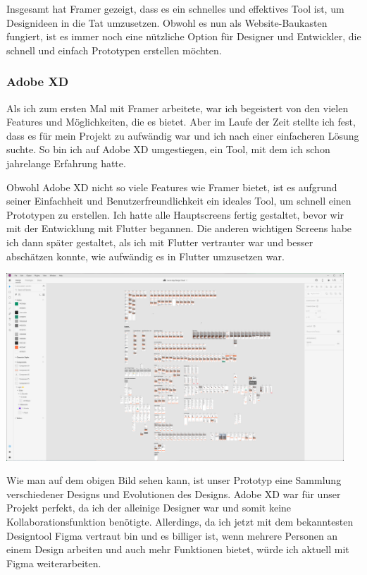 Insgesamt hat Framer gezeigt, dass es ein schnelles und effektives Tool ist, um Designideen in die Tat umzusetzen. Obwohl es nun als Website-Baukasten fungiert, ist es immer noch eine nützliche Option für Designer und Entwickler, die schnell und einfach Prototypen erstellen möchten.

\subsubsection{Adobe XD}
Als ich zum ersten Mal mit Framer arbeitete, war ich begeistert von den vielen Features und Möglichkeiten, die es bietet. Aber im Laufe der Zeit stellte ich fest, dass es für mein Projekt zu aufwändig war und ich nach einer einfacheren Lösung suchte. So bin ich auf Adobe XD umgestiegen, ein Tool, mit dem ich schon jahrelange Erfahrung hatte.

Obwohl Adobe XD nicht so viele Features wie Framer bietet,
ist es aufgrund seiner Einfachheit und
Benutzerfreundlichkeit ein ideales Tool, um schnell einen
Prototypen zu erstellen. Ich hatte alle Hauptscreens
fertig gestaltet, bevor wir mit der Entwicklung mit Flutter
begannen. Die anderen wichtigen Screens habe ich dann
später gestaltet, als ich mit Flutter vertrauter war und
besser abschätzen konnte, wie aufwändig es in Flutter
umzusetzen war.

\includegraphics[width=0.95\textwidth]{pics/nochba-adobe-xd-protoype-screenshot.png}


Wie man auf dem obigen Bild sehen kann, ist unser Prototyp
eine Sammlung verschiedener Designs und Evolutionen des
Designs. Adobe XD war für unser Projekt perfekt, da ich der
alleinige Designer war und somit keine
Kollaborationsfunktion benötigte. Allerdings, da ich jetzt
mit dem bekanntesten Designtool Figma vertraut bin und es billiger ist, wenn mehrere
Personen an einem Design arbeiten und auch mehr Funktionen
bietet, würde ich aktuell mit Figma weiterarbeiten.

